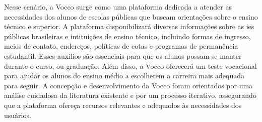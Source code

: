 Nesse cenário, a Vocco surge como uma plataforma dedicada a atender as necessidades dos alunos de escolas públicas que buscam orientações sobre o ensino técnico e superior. A plataforma disponibilizará diversas informações sobre as \ac{ies}  públicas brasileiras e intituições de ensino técnico, incluindo formas de ingresso, meios de contato, endereços, políticas de cotas e programas de permanência estudantil. Esses auxílios são essenciais para que os alunos possam se manter durante o curso, ou graduação. Além disso, a Vocco oferecerá um teste vocacional para ajudar os alunos do ensino médio a escolherem a carreira mais adequada para seguir. A concepção e desenvolvimento da Vocco foram orientados por uma análise cuidadosa da literatura existente e por um processo iterativo, assegurando que a plataforma ofereça recursos relevantes e adequados às necessidades dos usuários.




% 
% 
% 

